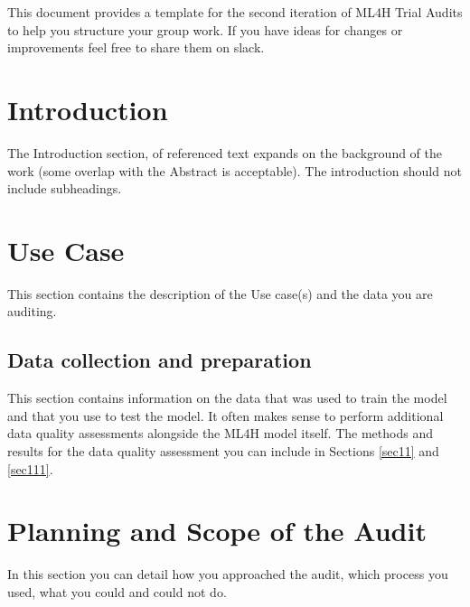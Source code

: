 \documentclass{article}
\begin{document}
This document provides a template for the second iteration of ML4H Trial Audits to help you structure your group work. If you have ideas for changes or improvements feel free to share them on slack.

\section{Introduction}\label{sec1}

The Introduction section, of referenced text \cite{bib1} expands on the background of the work (some overlap with the Abstract is acceptable). The introduction should not include subheadings.

\section{Use Case}
This section contains the description of the Use case(s) and the data you are auditing.

\subsection{Data collection and preparation}
This section contains information on the data that was used to train the model and that you use to test the model. It often makes sense to perform additional data quality assessments alongside the ML4H model itself. The methods and results for the data quality assessment you can include in Sections \ref{sec11} and \ref{sec111}.

\section{Planning and Scope of the Audit}
In this section you can detail how you approached the audit, which process you used, what you could and could not do.
\end{document}
